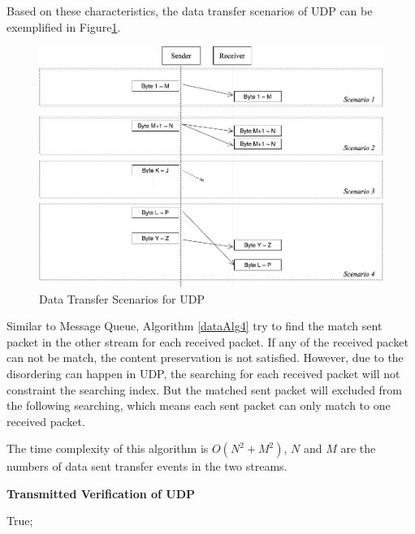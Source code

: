 Based on these characteristics, the data transfer scenarios of UDP can be exemplified in Figure\ref{upd}.
\begin{figure}[H]
\centerline{\includegraphics[scale=0.4]{Figures/udp}}
 \caption{Data Transfer Scenarios for UDP}
\label{upd}
\end{figure}

Similar to Message Queue, Algorithm \ref{dataAlg4} try to find the match sent packet in the other stream for each received packet. If any of the received packet can not be match, the content preservation is not satisfied. However, due to the disordering can happen in UDP, the searching for each received packet will not constraint the searching index. But the matched sent packet will excluded from the following searching, which means each sent packet can only match to one received packet.

The time complexity of this algorithm is $O(N^2+M^2)$, $N$ and $M$ are the numbers of data sent transfer events in the two streams.

\begin{algorithm}[H]
\DontPrintSemicolon
\caption{{\bf Transmitted Verification of UDP} \label{dataAlg4}}
\;
 \KwRet True;\;
\end{algorithm} 

